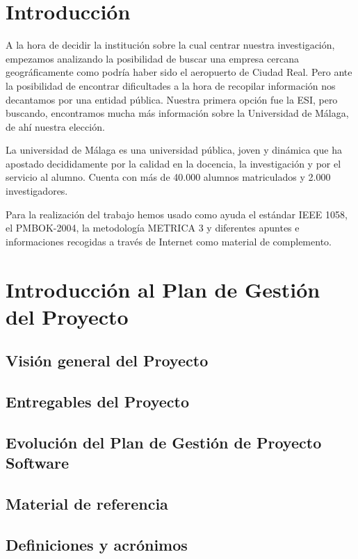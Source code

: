 \documentclass[11pt,a4paper,spanish,twoside]{report}
\begin{document}
\tableofcontents

\chapter*{Introducción}

A la hora de decidir la institución sobre la cual centrar nuestra 
investigación, empezamos analizando la posibilidad de buscar una empresa 
cercana geográficamente como podría haber sido el aeropuerto de Ciudad Real. 
Pero ante la posibilidad de encontrar dificultades a la hora de recopilar 
información nos decantamos por una entidad pública. Nuestra primera opción fue 
la ESI, pero buscando, encontramos mucha más información sobre la Universidad 
de Málaga, de ahí nuestra elección.

La universidad de Málaga es una universidad pública, joven y dinámica que ha 
apostado decididamente por la calidad en la docencia, la investigación y por el
servicio al alumno. Cuenta con más de 40.000 alumnos matriculados y 2.000 
investigadores. 

Para la realización del trabajo hemos usado como ayuda el estándar IEEE 1058, 
el PMBOK-2004, la metodología METRICA 3 y diferentes apuntes e informaciones 
recogidas a través de Internet como material de complemento.

\chapter{Introducción al Plan de Gestión del Proyecto}
\section{Visión general del Proyecto}
\section{Entregables del Proyecto}
\section{Evolución del Plan de Gestión de Proyecto Software}
\section{Material de referencia}
\section{Definiciones y acrónimos}
\end{document}

